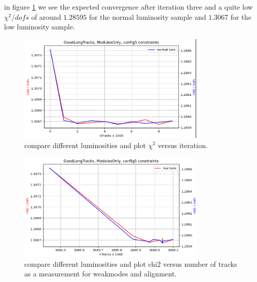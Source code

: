 in figure \ref{fig:chi2iter_lumi_normal} we see the expected convergence after iteration three and a quite low $\chi^2 / dofs$ of around $\num{1.28595}$ for the normal luminosity sample
and $\num{1.3067}$ for the low luminosity sample.

\begin{figure}
  \centering
  \includegraphics[width=0.8\textwidth]{plots/jan_17_2022/chi2_iter_low_vs_normal.png}
  \caption{compare different luminosities and plot $\chi^2$ versus iteration.}
  \label{fig:chi2iter_lumi_normal}
\end{figure}


\begin{figure}
  \centering
  \includegraphics[width=0.8\textwidth]{plots/jan_17_2022/chi2_tracks_modulesOnly.png}
  \caption{compare different luminosities and plot chi2 versus number of tracks as a measurement for weakmodes and alignment.}
  \label{fig:chi2tracks_lumi_normal}
\end{figure}


